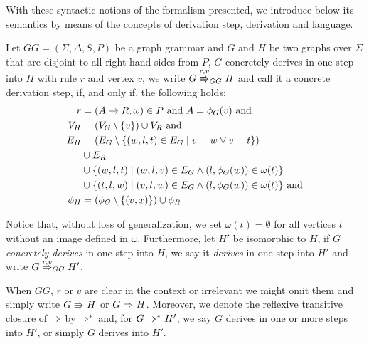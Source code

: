 \documentclass[runningheads]{llncs}
\begin{document}

With these syntactic notions of the formalism presented, we introduce below its semantics by means of the concepts of derivation step, derivation and language.

\begin{definition}
	\label{def:gg_dstep}
	Let $GG = (\Sigma, \Delta, S, P)$ be a graph grammar and $G$ and $H$ be two graphs over $\Sigma$ that are disjoint to all right-hand sides from $P$, $G$ concretely derives in one step into $H$ with rule $r$ and vertex $v$, we write $G \cderiv{r}{v}{GG} H$ and call it a concrete derivation step, if, and only if, the following holds:
	\begin{align*}
		r & = (A \to R, \omega) \in P \text{ and } A = \phi_G(v) \text{ and} \\
		V_H  & = (V_G \setminus \{v\}) \cup V_R \text{ and} \\
		E_H & = (E_G \setminus \{(w,l,t) \in E_G \; | \; v = w \lor v = t\}) \\
		& \cup E_R \\
		& \cup \{(w,l,t) \; | \; (w,l,v) \in E_G \land (l,\phi_G(w)) \in \omega(t)\} \\
		& \cup \{(t,l,w) \; | \; (v,l,w) \in E_G \land (l,\phi_G(w)) \in \omega(t)\} \text{ and} \\
		\phi_H & = (\phi_G \setminus \{(v,x)\}) \cup \phi_R
	\end{align*}
\end{definition}

Notice that, without loss of generalization, we set $\omega(t) = \emptyset$ for all vertices $t$ without an image defined in $\omega$. Furthermore, let $H'$ be isomorphic to $H$, if $G$ \textit{concretely derives} in one step into $H$, we say it \textit{derives} in one step into $H'$ and write $G \deriv{r}{v}{GG} H'$. 
	
When $GG$, $r$ or $v$ are clear in the context or irrelevant we might omit them and simply write $G \cderiv{}{}{} H$ or $G \deriv{}{}{} H$. Moreover, we denote the reflexive transitive closure of $\deriv{}{}{}$ by $\derivtr{}{}{}$ and, for $G \derivtr{}{}{} H'$, we say $G$ derives in one or more steps into $H'$, or simply $G$ derives into $H'$.

\end{document}
